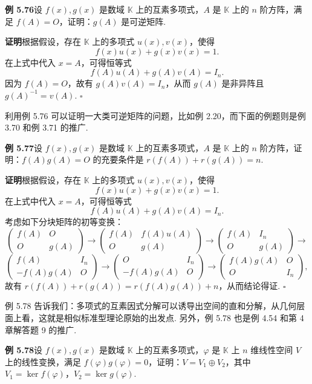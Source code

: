 \documentclass[UTF8,12pt,a4paper,fontset=fandol]{ctexart}
\begin{document}
\noindent\textbf{例 5.76}\quad 设 $f(x),g(x)$ 是数域 $\mathbb{K}$ 上的互素多项式，$A$ 是 $\mathbb{K}$ 上的 $n$ 阶方阵，满足 $f(A)=O$，证明：$g(A)$ 是可逆矩阵.

\noindent\textbf{证明}\quad 根据假设，存在 $\mathbb{K}$ 上的多项式 $u(x),v(x)$，使得
\[
f(x)u(x)+g(x)v(x)=1.
\]
在上式中代入 $x=A$，可得恒等式
\[
f(A)u(A)+g(A)v(A)=I_n.
\]
因为 $f(A)=O$，故有 $g(A)v(A)=I_n$，从而 $g(A)$ 是非异阵且 $g(A)^{-1}=v(A)$. \hfill $\square$

利用例 5.76 可以证明一大类可逆矩阵的问题，比如例 2.20，而下面的例题则是例 3.70 和例 3.71 的推广.

\noindent\textbf{例 5.77}\quad 设 $f(x),g(x)$ 是数域 $\mathbb{K}$ 上的互素多项式，$A$ 是 $\mathbb{K}$ 上的 $n$ 阶方阵，证明：$f(A)g(A)=O$ 的充要条件是 $r(f(A))+r(g(A))=n$.

\noindent\textbf{证明}\quad 根据假设，存在 $\mathbb{K}$ 上的多项式 $u(x),v(x)$，使得
\[
f(x)u(x)+g(x)v(x)=1.
\]
在上式中代入 $x=A$，可得恒等式
\[
f(A)u(A)+g(A)v(A)=I_n.
\]
考虑如下分块矩阵的初等变换：
\[
\left(\begin{array}{cc}
f(A) & O\\
O & g(A)
\end{array}\right)
\to
\left(\begin{array}{cc}
f(A) & f(A)u(A)\\
O & g(A)
\end{array}\right)
\to
\left(\begin{array}{cc}
f(A) & I_n\\
O & g(A)
\end{array}\right)
\to
\]
\[
\left(\begin{array}{cc}
f(A) & I_n\\
-f(A)g(A) & O
\end{array}\right)
\to
\left(\begin{array}{cc}
O & I_n\\
-f(A)g(A) & O
\end{array}\right)
\to
\left(\begin{array}{cc}
f(A)g(A) & O\\
O & I_n
\end{array}\right),
\]
故有 $r(f(A))+r(g(A))=r(f(A)g(A))+n$，从而结论得证. \hfill $\square$

例 5.78 告诉我们：多项式的互素因式分解可以诱导出空间的直和分解，从几何层面上看，这就是相似标准型理论原始的出发点. 另外，例 5.78 也是例 4.54 和第 4 章解答题 9 的推广.

\noindent\textbf{例 5.78}\quad 设 $f(x),g(x)$ 是数域 $\mathbb{K}$ 上的互素多项式，$\varphi$ 是 $\mathbb{K}$ 上 $n$ 维线性空间 $V$ 上的线性变换，满足 $f(\varphi)g(\varphi)=0$，证明：$V=V_1\oplus V_2$，其中 $V_1=\ker f(\varphi)$，$V_2=\ker g(\varphi)$.
\end{document}
